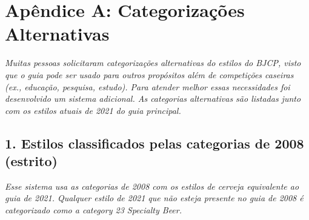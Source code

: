 \clearpage
{}
\divisorLine
\section*{Apêndice A: Categorizações Alternativas}

\textit{Muitas pessoas solicitaram categorizações alternativas do estilos do BJCP, visto que o guia pode ser usado para outros propósitos além de competições caseiras (ex., educação, pesquisa, estudo). Para atender melhor essas necessidades foi desenvolvido um sistema adicional. As categorias alternativas são listadas junto com os estilos atuais de 2021 do guia principal.}

\begin{multicols}{2}

\subsection*{1. Estilos classificados pelas categorias de 2008 (estrito)}

\textit{Esse sistema usa as categorias de 2008 com os estilos de cerveja equivalente ao guia de 2021. Qualquer estilo de 2021 que não esteja presente no guia de 2008 é categorizado como a category 23 Specialty Beer.}


\end{multicols}
